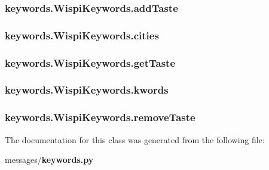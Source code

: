 \subsubsection[{add\+Taste}]{\setlength{\rightskip}{0pt plus 5cm}keywords.\+Wispi\+Keywords.\+add\+Taste}\label{classkeywords_1_1_wispi_keywords_a89e9b3dcde8fcec73e943cc5dbc31fd2}
\subsubsection[{cities}]{\setlength{\rightskip}{0pt plus 5cm}keywords.\+Wispi\+Keywords.\+cities}\label{classkeywords_1_1_wispi_keywords_ae3b4a2985afa9daa27701b0c65132ec2}
\subsubsection[{get\+Taste}]{\setlength{\rightskip}{0pt plus 5cm}keywords.\+Wispi\+Keywords.\+get\+Taste}\label{classkeywords_1_1_wispi_keywords_a20c65e2aa3d4069e0ccf3c5235552db8}
\subsubsection[{kwords}]{\setlength{\rightskip}{0pt plus 5cm}keywords.\+Wispi\+Keywords.\+kwords}\label{classkeywords_1_1_wispi_keywords_aae9d28b425fb8939ba1e456e177d9b6b}
\subsubsection[{remove\+Taste}]{\setlength{\rightskip}{0pt plus 5cm}keywords.\+Wispi\+Keywords.\+remove\+Taste}\label{classkeywords_1_1_wispi_keywords_add3c32d25fb69862d7b0087ed0b59b4f}


The documentation for this class was generated from the following file\+:\begin{DoxyCompactItemize}
\item 
messages/{\bf keywords.\+py}\end{DoxyCompactItemize}
